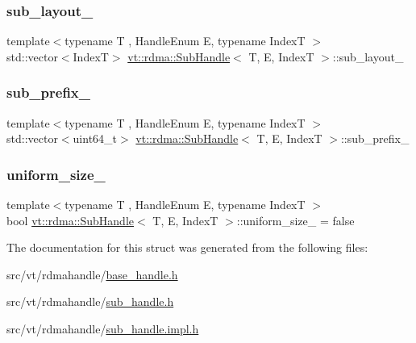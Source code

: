 \subsubsection{\texorpdfstring{sub\+\_\+layout\+\_\+}{sub\_layout\_}}
{\footnotesize\ttfamily template$<$typename T , Handle\+Enum E, typename IndexT $>$ \\
std\+::vector$<$IndexT$>$ \hyperlink{structvt_1_1rdma_1_1_sub_handle}{vt\+::rdma\+::\+Sub\+Handle}$<$ T, E, IndexT $>$\+::sub\+\_\+layout\+\_\+\hspace{0.3cm}{\ttfamily [protected]}}

\mbox{\label{structvt_1_1rdma_1_1_sub_handle_a964f4cb2857f1d970253f89ad5bb708c}} 
\subsubsection{\texorpdfstring{sub\+\_\+prefix\+\_\+}{sub\_prefix\_}}
{\footnotesize\ttfamily template$<$typename T , Handle\+Enum E, typename IndexT $>$ \\
std\+::vector$<$uint64\+\_\+t$>$ \hyperlink{structvt_1_1rdma_1_1_sub_handle}{vt\+::rdma\+::\+Sub\+Handle}$<$ T, E, IndexT $>$\+::sub\+\_\+prefix\+\_\+\hspace{0.3cm}{\ttfamily [protected]}}

\mbox{\label{structvt_1_1rdma_1_1_sub_handle_ab6c87db6739367bdbd95be5a8f673fc8}} 
\subsubsection{\texorpdfstring{uniform\+\_\+size\+\_\+}{uniform\_size\_}}
{\footnotesize\ttfamily template$<$typename T , Handle\+Enum E, typename IndexT $>$ \\
bool \hyperlink{structvt_1_1rdma_1_1_sub_handle}{vt\+::rdma\+::\+Sub\+Handle}$<$ T, E, IndexT $>$\+::uniform\+\_\+size\+\_\+ = false\hspace{0.3cm}{\ttfamily [protected]}}



The documentation for this struct was generated from the following files\+:\begin{DoxyCompactItemize}
\item 
src/vt/rdmahandle/\hyperlink{base__handle_8h}{base\+\_\+handle.\+h}\item 
src/vt/rdmahandle/\hyperlink{sub__handle_8h}{sub\+\_\+handle.\+h}\item 
src/vt/rdmahandle/\hyperlink{sub__handle_8impl_8h}{sub\+\_\+handle.\+impl.\+h}\end{DoxyCompactItemize}
